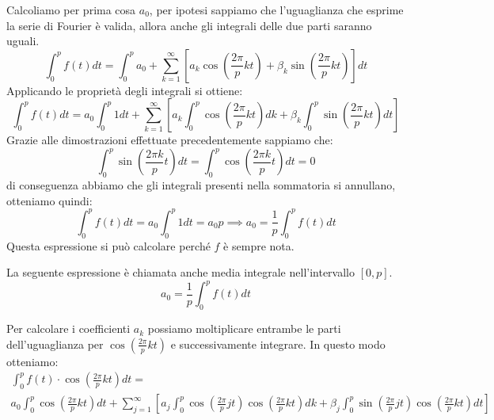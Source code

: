 Calcoliamo per prima cosa $a_0$, per ipotesi sappiamo che l'uguaglianza che esprime
la serie di Fourier è valida, allora anche gli integrali delle due parti saranno
uguali.
\begin{equation*}
    \int_{0}^{p}f(t) dt=\int_{0}^{p} a_0 + \sum_{k=1}^{\infty}\left[a_k\cos
        (\frac{2\pi}{p}kt) +\beta_k\sin(\frac{2\pi}{p}kt)\right]dt
\end{equation*}
Applicando le proprietà degli integrali si ottiene:
\begin{equation*}
    \int_{0}^{p}f(t) dt=a_0\int_{0}^{p} 1dt + \sum_{k=1}^{\infty}\left[a_k
        \int_{0}^{p}\cos (\frac{2\pi}{p}kt)dk +\beta_k\int_{0}^{p}\sin(
        \frac{2\pi}{p}kt)dt\right]
\end{equation*}
Grazie alle dimostrazioni effettuate precedentemente sappiamo che:
\begin{equation*}
    \int_{0}^{p}\sin \left(\frac{2\pi k}{p}t\right) dt =
    \int_{0}^{p}\cos \left(\frac{2\pi k}{p}t\right) dt = 0
\end{equation*}
di conseguenza abbiamo che gli integrali presenti nella sommatoria si annullano,
otteniamo quindi:
\begin{equation*}
    \int_{0}^{p}f(t) dt = a_0\int_{0}^{p} 1dt  = a_0p\implies a_0 = \frac{1}{p}
    \int_{0}^{p}f(t) dt
\end{equation*}
Questa espressione si può calcolare perché $f$ è sempre nota.
\begin{nota}
    La seguente espressione è chiamata anche media integrale nell'intervallo $[0,p]$.
    \begin{equation*}
        a_0 = \frac{1}{p}\int_{0}^{p}f(t) dt
    \end{equation*}
\end{nota}
Per calcolare i coefficienti $a_k$ possiamo moltiplicare entrambe le parti
dell'uguaglianza per $\cos\left(\frac{2\pi}{p}kt\right)$ e successivamente
integrare. In questo modo otteniamo:
\begin{equation*}
    \begin{aligned}
        \int_{0}^{p}f(t) \cdot \cos\left(\frac{2\pi}{p}kt\right) dt = \\ a_0\int_{0}^{p}
        \cos\left(\frac{2\pi}{p}kt\right) dt + \sum_{j=1}^{\infty}\left[a_j\int_{0}^{p}
            \cos \left(\frac{2\pi}{p}jt\right) \cos\left(\frac{2\pi}{p}kt\right)dk +
            \beta_j\int_{0}^{p}\sin\left(\frac{2\pi}{p}jt\right)\cos\left(\frac{2\pi}{p}kt\right)dt\right]
    \end{aligned}
\end{equation*}
